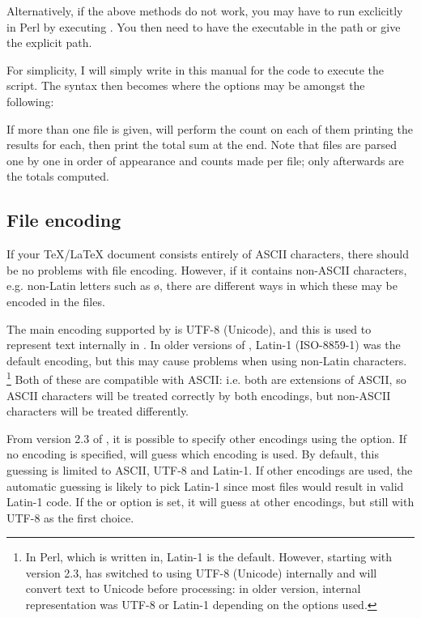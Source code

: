 \documentclass{article}
\begin{document}
Alternatively, if the above methods do not work, you may have to run \TeXcount{} exclicitly in Perl by executing . You then need to have the  executable in the path or give the explicit path.

For simplicity, I will simply write  in this manual for the code to execute the script. The syntax then becomes
where the options may be amongst the following:



If more than one file is given, \TeXcount{} will perform the count on each of them printing the results for each, then print the total sum at the end. Note that files are parsed one by one in order of appearance and counts made per file; only afterwards are the totals computed. 

\subsection{File encoding}

If your \TeX/\LaTeX{} document consists entirely of ASCII characters, there should be no problems with file encoding. However, if it contains non-ASCII characters, e.g. non-Latin letters such as \o{}, there are different ways in which these may be encoded in the files.

The main encoding supported by \TeXcount{} is UTF-8 (Unicode), and this is used to represent text internally in \TeXcount{}. In older versions of \TeXcount{}, Latin-1 (ISO-8859-1) was the default encoding, but this may cause problems when using non-Latin characters.%
\footnote{%
In Perl, which \TeXcount{} is written in, Latin-1 is the default. However, starting with version 2.3, \TeXcount{} has switched to using UTF-8 (Unicode) internally and will convert text to Unicode before processing: in older version, internal representation was UTF-8 or Latin-1 depending on the options used.}
Both of these are compatible with ASCII: i.e. both are extensions of ASCII, so ASCII characters will be treated correctly by both encodings, but non-ASCII characters will be treated differently.

From version 2.3 of \TeXcount{}, it is possible to specify other encodings using the  option. If no encoding is specified, \TeXcount{} will guess which encoding is used. By default, this guessing is limited to ASCII, UTF-8 and Latin-1. If other encodings are used, the automatic guessing is likely to pick Latin-1 since most files would result in valid Latin-1 code. If the  or  option is set, it will guess at other encodings, but still with UTF-8 as the first choice.
\end{document}
